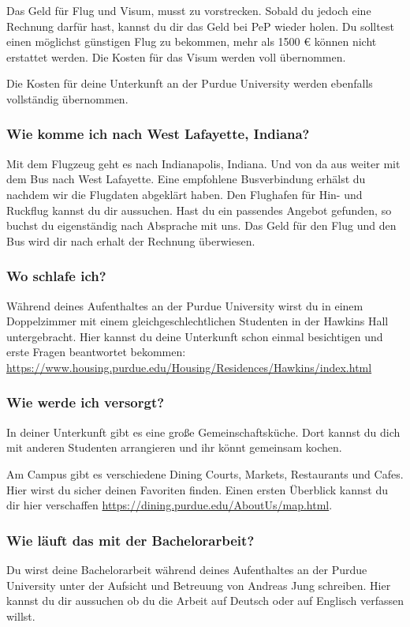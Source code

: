 \documentclass[
  paper=a4,
  fontsize=12pt,
  DIV=16,
  headheight=52pt,
  footheight=45pt,
  headinclude,
  parskip=full,
]{scrartcl}
\begin{document}
Das Geld für Flug und Visum, musst zu vorstrecken.
Sobald du jedoch eine Rechnung darfür hast, kannst du dir das Geld bei PeP
wieder holen.
Du solltest einen möglichst günstigen Flug zu bekommen, mehr als 1500 € können
nicht erstattet werden.
Die Kosten für das Visum werden voll übernommen.

Die Kosten für deine Unterkunft an der Purdue University werden ebenfalls
vollständig übernommen.

\subsubsection*{Wie komme ich nach West Lafayette, Indiana?}
Mit dem Flugzeug geht es nach Indianapolis, Indiana. Und von da aus weiter
mit dem Bus nach West Lafayette.
Eine empfohlene Busverbindung erhälst du nachdem wir die Flugdaten abgeklärt
haben.
Den Flughafen für Hin- und Ruckflug kannst du dir aussuchen.
Hast du ein passendes Angebot gefunden, so buchst du eigenständig nach Absprache
mit uns. Das Geld für den Flug und den Bus wird dir nach erhalt der Rechnung
überwiesen.


\subsubsection*{Wo schlafe ich?}
Während deines Aufenthaltes an der Purdue University wirst du in einem
Doppelzimmer mit einem gleichgeschlechtlichen Studenten in der Hawkins Hall
untergebracht.
Hier kannst du deine Unterkunft schon einmal besichtigen und erste Fragen
beantwortet bekommen:
\url{https://www.housing.purdue.edu/Housing/Residences/Hawkins/index.html}

\subsubsection*{Wie werde ich versorgt?}
In deiner Unterkunft gibt es eine große Gemeinschaftsküche.
Dort kannst du dich mit anderen Studenten arrangieren und ihr könnt gemeinsam
kochen.

Am Campus gibt es verschiedene Dining Courts, Markets, Restaurants und Cafes.
Hier wirst du sicher deinen Favoriten finden.
Einen ersten Überblick kannst du dir hier verschaffen
\url{https://dining.purdue.edu/AboutUs/map.html}.

\subsubsection*{Wie läuft das mit der Bachelorarbeit?}
Du wirst deine Bachelorarbeit während deines Aufenthaltes an der Purdue
University unter der Aufsicht und Betreuung von Andreas Jung schreiben.
Hier kannst du dir aussuchen ob du die Arbeit auf Deutsch oder auf Englisch
verfassen willst.
\end{document}
